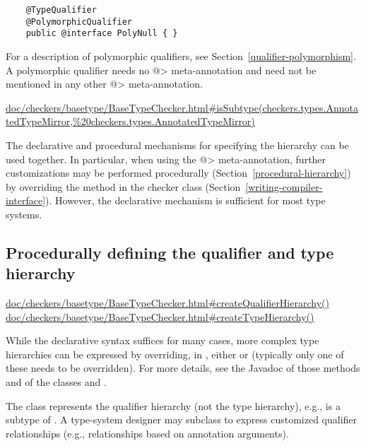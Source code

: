 \begin{itemize}
  \begin{Verbatim}
    @TypeQualifier
    @PolymorphicQualifier
    public @interface PolyNull { }
  \end{Verbatim}

  For a description of polymorphic qualifiers, see
  Section~\ref{qualifier-polymorphism}.  A polymorphic qualifier needs
  no \<@> meta-annotation and need not be
  mentioned in any other \<@>
  meta-annotation.

\end{itemize}

\urldef{\isSubtypeURL}\url{doc/checkers/basetype/BaseTypeChecker.html#isSubtype(checkers.types.AnnotatedTypeMirror,%20checkers.types.AnnotatedTypeMirror)}

The declarative and procedural mechanisms for specifying the hierarchy can
be used together.  In particular, when using the \<@>
meta-annotation, further customizations may be
performed procedurally (Section~\ref{procedural-hierarchy})
by overriding the  method in the checker class
(Section~\ref{writing-compiler-interface}).
However, the declarative mechanism is sufficient for most type systems.


\subsection{Procedurally defining the qualifier and type hierarchy\label{procedural-hierarchy}}

\urldef{\createQualifierHierarchyURL}\url{doc/checkers/basetype/BaseTypeChecker.html#createQualifierHierarchy()}
\urldef{\createTypeHierarchyURL}\url{doc/checkers/basetype/BaseTypeChecker.html#createTypeHierarchy()}

While the declarative syntax suffices for many cases, more complex
type hierarchies can be expressed by overriding, in ,
either  or  (typically
only one of these needs to be overridden).
For more details, see the Javadoc of those methods and of the classes
 and .

The  class represents the qualifier hierarchy (not the
type hierarchy), e.g., 
is a subtype of .  A type-system designer may subclass
 to express customized qualifier
relationships (e.g., relationships based on annotation
arguments).

